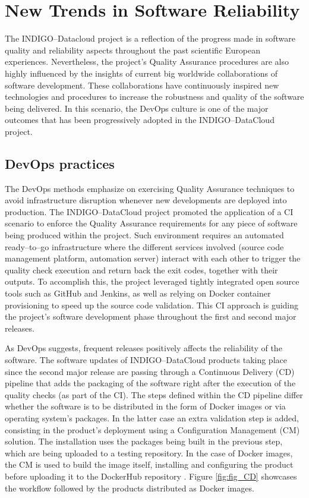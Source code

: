 \documentclass[journal]{IEEEtran}
\begin{document}
\section{New Trends in Software Reliability}

The INDIGO--Datacloud project is a reflection of the progress made in software quality and reliability aspects throughout the past scientific European experiences. Nevertheless, the project’s Quality Assurance procedures are also highly influenced by the insights of current big worldwide collaborations of software development. These collaborations have continuously inspired new technologies and procedures to increase the robustness and quality of the software being delivered. In this scenario, the DevOps culture is one of the major outcomes that has been progressively adopted in the INDIGO--DataCloud project.

\subsection{DevOps practices}

The DevOps methods emphasize on exercising Quality Assurance techniques to avoid infrastructure disruption whenever new developments are deployed into production. The INDIGO--DataCloud project promoted the application of a CI scenario to enforce the Quality Assurance requirements for any piece of software being produced within the project. Such environment requires an automated ready--to--go infrastructure where the different services involved (source code management platform, automation server) interact with each other to trigger the quality check execution and return back the exit codes, together with their outputs. To accomplish this, the project leveraged tightly integrated open source tools such as GitHub and Jenkins, as well as relying on Docker container provisioning to speed up the source code validation. This CI approach is guiding the project’s software development phase throughout the first and second major releases.

As DevOps suggests, frequent releases positively affects the reliability of the software. The software updates of INDIGO--DataCloud products taking place since the second major release are passing through a Continuous Delivery (CD) pipeline that adds the packaging of the software right after the execution of the quality checks (as part of the CI). The steps defined within the CD pipeline differ whether the software is to be distributed in the form of Docker images or via operating system’s packages. In the latter case an extra validation step is added, consisting in the product’s deployment using a Configuration Management (CM) solution. The installation uses the packages being built in the previous step, which are being uploaded to a testing repository. In the case of Docker images, the CM is used to build the image itself, installing and configuring the product before uploading it to the DockerHub repository \cite{indigo-dockerhub}. Figure \ref{fig:fig_CD} showcases the workflow followed by the products distributed as Docker images.
\end{document}

